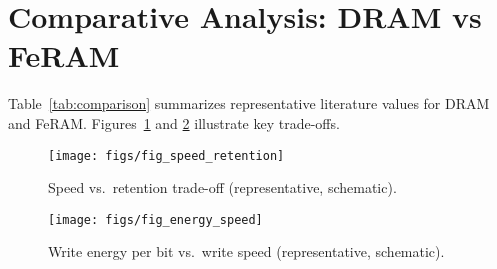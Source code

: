 \section{Comparative Analysis: DRAM vs FeRAM}
\label{sec:comparison}

Table~\ref{tab:comparison} summarizes representative literature values for DRAM and FeRAM. Figures~\ref{fig:speed_retention} and \ref{fig:energy_speed} illustrate key trade-offs.

\begin{figure}[!t]
  \centering
  \texttt{[image: figs/fig\_speed\_retention]}
  \caption{Speed vs.\ retention trade-off (representative, schematic).}
  \label{fig:speed_retention}
\end{figure}

\begin{figure}[!t]
  \centering
  \texttt{[image: figs/fig\_energy\_speed]}
  \caption{Write energy per bit vs.\ write speed (representative, schematic).}
  \label{fig:energy_speed}
\end{figure}
